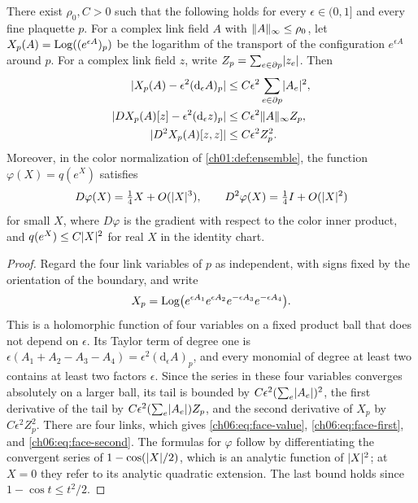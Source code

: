 \begin{lemma}\label{ch06:lem:plaquette-taylor}
There exist $\rho_0,C>0$ such that the following holds for every $\epsilon\in(0,1]$ and every fine plaquette $p$. For a complex link field $A$ with $\lVert A\rVert_\infty\le\rho_0$, let $X_p(A)=\operatorname{Log}((e^{\epsilon A})_p)$ be the logarithm of the transport of the configuration $e^{\epsilon A}$ around $p$. For a complex link field $z$, write $Z_p=\sum_{e\in\partial p}\lvert z_e\rvert$. Then
\begin{align}
 \lvert X_p(A)-\epsilon^2(\mathrm d_\epsilon A)_p\rvert&\le C\epsilon^2\sum_{e\in\partial p}\lvert A_e\rvert^2,\label{ch06:eq:face-value}\\
 \lvert DX_p(A)[z]-\epsilon^2(\mathrm d_\epsilon z)_p\rvert&\le C\epsilon^2\lVert A\rVert_\infty Z_p,\label{ch06:eq:face-first}\\
 \lvert D^2X_p(A)[z,z]\rvert&\le C\epsilon^2Z_p^2.\label{ch06:eq:face-second}
\end{align}
Moreover, in the color normalization of \cref{ch01:def:ensemble}, the function $\varphi(X)=q(e^X)$ satisfies
\[
 D\varphi(X)=\tfrac14X+O(\lvert X\rvert^3),\qquad D^2\varphi(X)=\tfrac14I+O(\lvert X\rvert^2)
\]
for small $X$, where $D\varphi$ is the gradient with respect to the color inner product, and $q(e^X)\le C\lvert X\rvert^2$ for real $X$ in the identity chart.
\end{lemma}

\begin{proof}
Regard the four link variables of $p$ as independent, with signs fixed by the orientation of the boundary, and write
\[
 X_p=\operatorname{Log}\bigl(e^{\epsilon A_1}e^{\epsilon A_2}e^{-\epsilon A_3}e^{-\epsilon A_4}\bigr).
\]
This is a holomorphic function of four variables on a fixed product ball that does not depend on $\epsilon$. Its Taylor term of degree one is $\epsilon(A_1+A_2-A_3-A_4)=\epsilon^2(\mathrm d_\epsilon A)_p$, and every monomial of degree at least two contains at least two factors $\epsilon$. Since the series in these four variables converges absolutely on a larger ball, its tail is bounded by $C\epsilon^2(\sum_e\lvert A_e\rvert)^2$, the first derivative of the tail by $C\epsilon^2(\sum_e\lvert A_e\rvert)Z_p$, and the second derivative of $X_p$ by $C\epsilon^2Z_p^2$. There are four links, which gives \eqref{ch06:eq:face-value}, \eqref{ch06:eq:face-first}, and \eqref{ch06:eq:face-second}. The formulas for $\varphi$ follow by differentiating the convergent series of $1-\cos(\lvert X\rvert/2)$, which is an analytic function of $\lvert X\rvert^2$; at $X=0$ they refer to its analytic quadratic extension. The last bound holds since $1-\cos t\le t^2/2$.
\end{proof}

